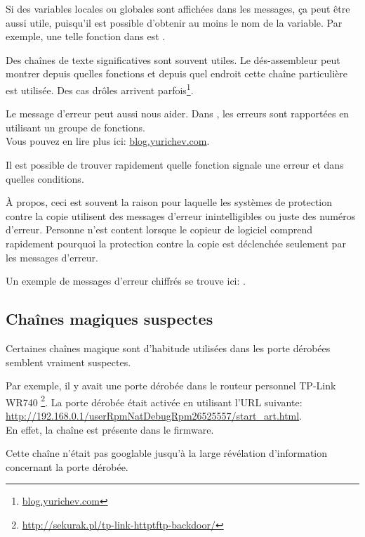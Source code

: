 Si des variables locales ou globales sont affichées dans les messages, ça peut être
aussi utile, puisqu'il est possible d'obtenir au moins le nom de la variable.
Par exemple, une telle fonction dans \oracle est .

Des chaînes de texte significatives sont souvent utiles.
Le dés-assembleur \IDA peut montrer depuis quelles fonctions et depuis quel endroit
cette chaîne particulière est utilisée.
Des cas drôles arrivent parfois\footnote{\href{http://go.yurichev.com/17223}{blog.yurichev.com}}.

Le message d'erreur peut aussi nous aider.
Dans \oracle, les erreurs sont rapportées en utilisant un groupe de fonctions.\\
Vous pouvez en lire plus ici: \href{http://go.yurichev.com/17224}{blog.yurichev.com}.


Il est possible de trouver rapidement quelle fonction signale une erreur et dans
quelles conditions.

À propos, ceci est souvent la raison pour laquelle les systèmes de protection contre
la copie utilisent des messages d'erreur inintelligibles ou juste des numéros d'erreur.
Personne n'est content lorsque le copieur de logiciel comprend rapidement pourquoi
la protection contre la copie est déclenchée seulement par les messages d'erreur.

Un exemple de messages d'erreur chiffrés se trouve ici: .

\subsection{Chaînes magiques suspectes}

Certaines chaînes magique sont d'habitude utilisées dans les porte dérobées semblent
vraiment suspectes.

Par exemple, il y avait une porte dérobée dans le routeur personnel TP-Link WR740%
\footnote{\url{http://sekurak.pl/tp-link-httptftp-backdoor/}}.
La porte dérobée était activée en utilisant l'URL suivante:\\
\url{http://192.168.0.1/userRpmNatDebugRpm26525557/start_art.html}.\\

En effet, la chaîne  est présente dans le firmware.

Cette chaîne n'était pas googlable jusqu'à la large révélation d'information concernant
la porte dérobée.

